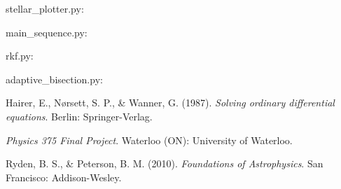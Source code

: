 \documentclass[11pt]{article}
\begin{document}
stellar\_plotter.py:


main\_sequence.py:


rkf.py:


adaptive\_bisection.py:


\newpage

\begin{thebibliography}{9}

	 Hairer, E., N{\o}rsett, S. P., \& Wanner, G. (1987). \textit{Solving ordinary differential equations}. Berlin: Springer-Verlag.
	
	 \textit{Physics 375 Final Project}. Waterloo (ON): University of Waterloo.
	
	 Ryden, B. S., \& Peterson, B. M. (2010). \textit{Foundations of Astrophysics}. San Francisco: Addison-Wesley.
	
\end{thebibliography}
\end{document}
